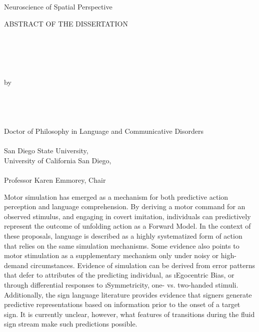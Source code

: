             \indent\indent Neuroscience of Spatial Perspective  \\
            \doublespacing 
        \newpage
            \thispagestyle{plain}
             \doublespacing
            \begin{center} \begin{singlespace}
            ABSTRACT OF THE DISSERTATION
            \\~\\~\\ \mytitle
            \\~\\~\\ by \\~\\~\\ \myname
            \\~\\ Doctor of Philosophy in Language and Communicative Disorders\\~\\
            San Diego State University, \the\year \\
            University of California San Diego, \the\year \\~\\
            Professor Karen Emmorey, Chair \\
            \end{singlespace} \end{center} 
            \hspace{\parindent}Motor simulation has emerged as a mechanism for both predictive action perception and language comprehension. By deriving a motor command for an observed stimulus, and engaging in covert imitation, individuals can predictively represent the outcome of unfolding action as a Forward Model. In the context of these proposals, language is described as a highly systematized form of action that relies on the same simulation mechanisms. Some evidence also points to motor stimulation as a supplementary mechanism only under noisy or high-demand circumstances. Evidence of simulation can be derived from error patterns that defer to attributes of the predicting individual, as \i{Egocentric Bias}, or through differential responses to \i{Symmetricity}, one- vs. two-handed stimuli. Additionally, the sign language literature provides evidence that signers generate predictive representations based on information prior to the onset of a target sign. It is currently unclear, however, what features of transitions during the fluid sign stream make such predictions possible.\par
